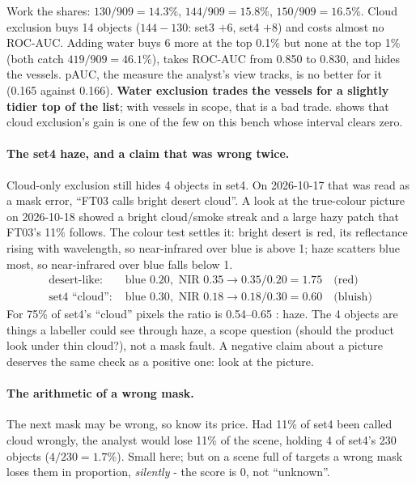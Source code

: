 Work the shares: $130/909 = 14.3\%$, $144/909 = 15.8\%$, $150/909 = 16.5\%$. Cloud exclusion buys 14 objects
($144 - 130$: set3 $+6$, set4 $+8$) and costs almost no ROC-AUC. Adding water buys 6 more at the top 0.1\% but none at
the top 1\% (both catch $419/909 = 46.1\%$), takes ROC-AUC from 0.850 to 0.830, and hides the vessels. pAUC, the
measure the analyst's view tracks, is no better for it (0.165 against 0.166). \textbf{Water exclusion trades the
vessels for a slightly tidier top of the list}; with vessels in scope, that is a bad trade.  shows
that cloud exclusion's gain is one of the few on this bench whose interval clears zero.

\paragraph{The set4 haze, and a claim that was wrong twice.} Cloud-only exclusion still hides 4 objects in set4. On
2026-10-17 that was read as a mask error, ``FT03 calls bright desert cloud''. A look at the true-colour picture on
2026-10-18 showed a bright cloud/smoke streak and a large hazy patch that FT03's 11\% follows. The colour test settles
it: bright desert is red, its reflectance rising with wavelength, so near-infrared over blue is above 1; haze scatters
blue most, so near-infrared over blue falls below 1.
\begin{align*}
\text{desert-like: } & \text{blue } 0.20, \text{ NIR } 0.35 \to 0.35 / 0.20 = 1.75 \quad \text{(red)}\\
\text{set4 ``cloud'': } & \text{blue } 0.30, \text{ NIR } 0.18 \to 0.18 / 0.30 = 0.60 \quad \text{(bluish)}
\end{align*}
For 75\% of set4's ``cloud'' pixels the ratio is 0.54--0.65
\hfil{}\hfilneg{}: haze. The 4 objects are things a labeller could see
through haze, a scope question (should the product look under thin cloud?), not a mask fault. A negative claim about a
picture deserves the same check as a positive one: look at the picture.

\paragraph{The arithmetic of a wrong mask.} The next mask may be wrong, so know its price. Had 11\% of set4 been called
cloud wrongly, the analyst would lose 11\% of the scene, holding 4 of set4's 230 objects
\hfil{}\hfilneg{} ($4 / 230 = 1.7\%$). Small
here; but on a scene full of targets a wrong mask loses them in proportion, \emph{silently} - the score is 0, not
``unknown''.

